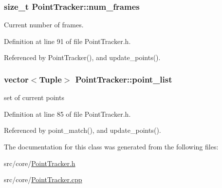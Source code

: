 \hypertarget{class_point_tracker_aa32e4991c19d192737ae6d5db32a504a}{
\subsubsection[{num\-\_\-frames}]{\setlength{\rightskip}{0pt plus 5cm}size\-\_\-t {\bf \-Point\-Tracker\-::num\-\_\-frames}}}
\label{class_point_tracker_aa32e4991c19d192737ae6d5db32a504a}


\-Current number of frames. 



\-Definition at line 91 of file \-Point\-Tracker.\-h.



\-Referenced by \-Point\-Tracker(), and update\-\_\-points().

\hypertarget{class_point_tracker_a3c396dbdf7e00c4cce3b371dd5cddd28}{
\subsubsection[{point\-\_\-list}]{\setlength{\rightskip}{0pt plus 5cm}vector$<${\bf \-Tuple}$>$ {\bf \-Point\-Tracker\-::point\-\_\-list}}}
\label{class_point_tracker_a3c396dbdf7e00c4cce3b371dd5cddd28}


set of current points 



\-Definition at line 85 of file \-Point\-Tracker.\-h.



\-Referenced by point\-\_\-match(), and update\-\_\-points().



\-The documentation for this class was generated from the following files\-:\begin{DoxyCompactItemize}
\item 
src/core/\hyperlink{_point_tracker_8h}{\-Point\-Tracker.\-h}\item 
src/core/\hyperlink{_point_tracker_8cpp}{\-Point\-Tracker.\-cpp}\end{DoxyCompactItemize}

